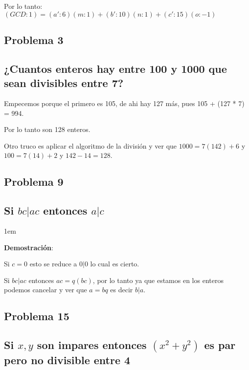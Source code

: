\documentclass[12pt, fleqn]{article}                             %
\newenvironment{SmallIndentation}[1][0.75em]                    %
    {\begin{adjustwidth}{#1}{}\begin{footnotesize}}                 %
    {\end{footnotesize}\end{adjustwidth}}                           %
\begin{document}
            Por lo tanto:
            $(GCD:1) = (a':6)(m:1) +(b':10)(n:1) + (c': 15)(o:-1)$


    \clearpage
    \subsection{Problema 3}
    \subsection*{¿Cuantos enteros hay entre 100 y 1000 que sean divisibles entre 7?}

        Empecemos porque el primero es 105, de ahi hay 127 más, pues 105 + (127 * 7) = 994.

        Por lo tanto son 128 enteros.

        Otro truco es aplicar el algoritmo de la división y ver que 
        $1000 = 7(142) + 6$ y $100 = 7(14) + 2$ y $142-14 = 128$.



    \subsection{Problema 9}
    \subsection*{Si $bc|ac$ entonces $a|c$}

        \begin{SmallIndentation}[1em]
            \textbf{Demostración}:

            Si $c=0$ esto se reduce a $0|0$ lo cual es cierto.

            Si $bc|ac$ entonces $ac = q(bc)$, por lo tanto ya que estamos en los
            enteros podemos cancelar y ver que $a = bq$ es decir $b|a$.

        \end{SmallIndentation}



    \subsection{Problema 15}
    \subsection*{Si $x, y$ son impares entonces $(x^2 +y^2)$ es par
        pero no divisible entre 4}
\end{document}
